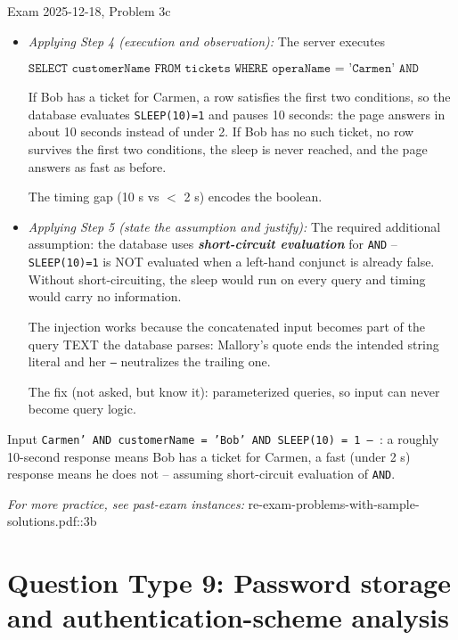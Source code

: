 \documentclass[12pt, a4paper]{article}
\newcommand{\term}[1]{\textbf{\textit{#1}}}        %
\begin{document}
\begin{practicebox}{Exam 2025-12-18, Problem 3c}
\begin{itemize}
The first \texttt{Carmen'} supplies a valid opera name and closes the opened quote; the two \texttt{AND} clauses append the boolean test and the timer; the trailing \texttt{--} comments out the server's own closing quote so the query stays syntactically valid.
    \item \textit{Applying Step 4 (execution and observation):} The server executes

\[
\texttt{SELECT customerName FROM tickets WHERE operaName = 'Carmen' AND customerName = 'Bob' AND SLEEP(10) = 1}
\]

If Bob has a ticket for Carmen, a row satisfies the first two conditions, so the database evaluates \texttt{SLEEP(10)=1} and pauses 10 seconds: the page answers in about 10 seconds instead of under 2. If Bob has no such ticket, no row survives the first two conditions, the sleep is never reached, and the page answers as fast as before.

The timing gap (10 s vs \(<\) 2 s) encodes the boolean.
    \item \textit{Applying Step 5 (state the assumption and justify):} The required additional assumption: the database uses \term{short-circuit evaluation} for \texttt{AND} -- \texttt{SLEEP(10)=1} is NOT evaluated when a left-hand conjunct is already false. Without short-circuiting, the sleep would run on every query and timing would carry no information.

    The injection works because the concatenated input becomes part of the query TEXT the database parses: Mallory's quote ends the intended string literal and her \texttt{--} neutralizes the trailing one.

    The fix (not asked, but know it): parameterized queries, so input can never become query logic.
\end{itemize}

\begin{answerbox}
Input \texttt{Carmen' AND customerName = 'Bob' AND SLEEP(10) = 1 -- }: a roughly 10-second response means Bob has a ticket for Carmen, a fast (under 2 s) response means he does not -- assuming short-circuit evaluation of \texttt{AND}.
\end{answerbox}
\end{practicebox}

\textit{For more practice, see past-exam instances:} re-exam-problems-with-sample-solutions.pdf::3b

\section{Question Type 9: Password storage and authentication-scheme analysis}
\end{document}
